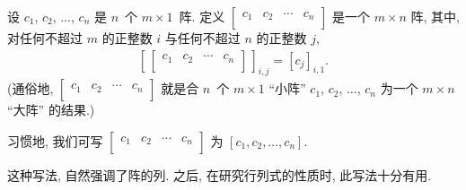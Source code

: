 \begin{definition}
    设 \(c_1\), \(c_2\), \(\dots\), \(c_n\)
    是 \(n\)~个 \(m \times 1\)~阵.
    定义
    \(
    \begin{bmatrix}
        c_1 & c_2 & \cdots & c_n \\
    \end{bmatrix}
    \)
    是一个 \(m \times n\) 阵,
    其中, 对任何不超过 \(m\) 的正整数 \(i\)
    与任何不超过 \(n\) 的正整数 \(j\),
    \begin{align*}
        \left[\,
            \begin{bmatrix}
                c_1 & c_2 & \cdots & c_n \\
            \end{bmatrix}
            \,\right]_{i,j}
        = [c_j]_{i,1}.
    \end{align*}
    (通俗地,
    \(
    \begin{bmatrix}
        c_1 & c_2 & \cdots & c_n \\
    \end{bmatrix}
    \)
    就是合 \(n\)~个 \(m \times 1\) ``小阵''
    \(c_1\), \(c_2\), \(\dots\), \(c_n\)
    为一个 \(m \times n\) ``大阵''
    的结果.)

    习惯地, 我们可写
    \(
    \begin{bmatrix}
        c_1 & c_2 & \cdots & c_n \\
    \end{bmatrix}
    \)
    为 \([c_1, c_2, \dots, c_n]\).
\end{definition}

这种写法, 自然强调了阵的列.
之后, 在研究行列式的性质时, 此写法十分有用.

